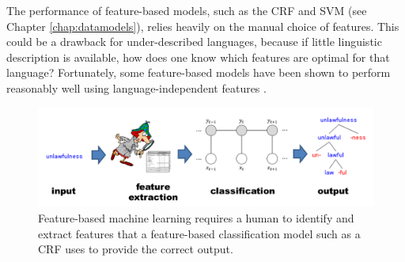 The performance of feature-based models, such as the CRF and SVM (see Chapter \ref{chap:datamodels}), relies heavily on the manual choice of features. This could be a drawback for under-described languages, because if little linguistic description is available, how does one know which features are optimal for that language? Fortunately, some feature-based models have been shown to perform reasonably well using language-independent features \citep{ruokolainen_comparative_2016,moeller_automatic_2018}.  

\begin{figure}[!tb]
\centering
\includegraphics[width=0.95\columnwidth]{figs/Features-ML.PNG}
\caption[Feature-based machine learning]{Feature-based machine learning requires a human to identify and extract features that a feature-based classification model such as a CRF uses to provide the correct output.}
\label{fig:Features}
\end{figure}


